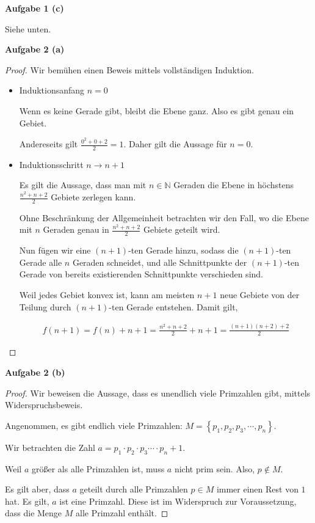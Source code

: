 \documentclass[12pt]{extarticle}
\begin{document}
\textbf{Aufgabe 1 (c)}

Siehe unten.


\textbf{Aufgabe 2 (a)}

\begin{proof}
  Wir bemühen einen Beweis mittels vollständigen Induktion.
  \begin{itemize}
  \item Induktionsanfang \(n=0\)

    Wenn es keine Gerade gibt, bleibt die Ebene ganz.  Also es gibt
    genau ein Gebiet.

    Andereseits gilt \(\frac{0^2+0+2}{2}=1\).  Daher gilt die Aussage
    für \(n=0\).
  \item Induktionsschritt \(n \rightarrow n+1\)

    Es gilt die Aussage, dass man mit \(n \in \mathbb{N}\) Geraden die
    Ebene in höchstens \(\frac{n^2+n+2}{2}\) Gebiete zerlegen kann.

    Ohne Beschränkung der Allgemeinheit betrachten wir den Fall, wo
    die Ebene mit \(n\) Geraden genau in \(\frac{n^2+n+2}{2}\) Gebiete
    geteilt wird.

    Nun fügen wir eine \((n+1)\)-ten Gerade hinzu, sodass die
    \((n+1)\)-ten Gerade alle \(n\) Geraden schneidet, und alle
    Schnittpunkte der \((n+1)\)-ten Gerade von bereits existierenden
    Schnittpunkte verschieden sind.

    Weil jedes Gebiet konvex ist, kann am meisten \(n+1\) neue Gebiete
    von der Teilung durch \((n+1)\)-ten Gerade entstehen.  Damit gilt,


\begin{align*}
f(n+1)=f(n)+n+1=\frac{n^2+n+2}{2}+n+1=\frac{(n+1)(n+2)+2}{2}
\end{align*}
  \end{itemize}
\end{proof}

\textbf{Aufgabe 2 (b)}

\begin{proof}
  Wir beweisen die Aussage, dass es unendlich viele Primzahlen gibt,
  mittels Widerspruchsbeweis.

  Angenommen, es gibt endlich viele Primzahlen:
  \(M= \left\{ p_1, p_2, p_3, \cdots, p_n \right\}\).

  Wir betrachten die Zahl $a=p_1\cdot p_2 \cdot p_3 \cdots \cdot
  p_n+1$.

  Weil \(a\) größer als alle Primzahlen ist, muss \(a\) nicht prim sein.
  Also, \(p \notin M\).

  Es gilt aber, dass \(a\) geteilt durch alle Primzahlen \(p \in M\) immer
  einen Rest von \(1\) hat.  Es gilt, \(a\) ist eine Primzahl.  Diese ist
  im Widerspruch zur Voraussetzung, dass die Menge \(M\) alle Primzahl enthält.
\end{proof}
\end{document}
